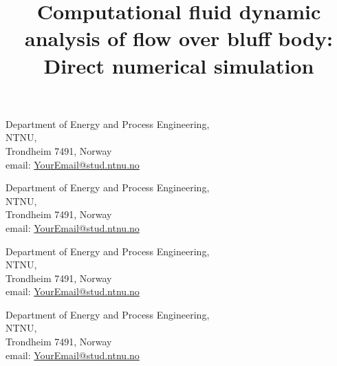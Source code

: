 \documentclass[subscriptcorrection,upint,varvw,mathalfa=cal=euler,barcolor=black,balance,hyphenate,french,pdf-a,nolists]{asmejour}
\begin{document}

	{Department of Energy and Process Engineering,\\
	NTNU,\\
	Trondheim 7491, Norway \\
	email: \href{mailto:YourEmail@stud.ntnu.no}{YourEmail@stud.ntnu.no}}

	{Department of Energy and Process Engineering,\\
	NTNU,\\
	Trondheim 7491, Norway \\
	email: \href{mailto:YourEmail@stud.ntnu.no}{YourEmail@stud.ntnu.no}}

	{Department of Energy and Process Engineering,\\
	NTNU,\\
	Trondheim 7491, Norway \\
	email: \href{mailto:YourEmail@stud.ntnu.no}{YourEmail@stud.ntnu.no}}

	{Department of Energy and Process Engineering,\\
	NTNU,\\
	Trondheim 7491, Norway \\
	email: \href{mailto:YourEmail@stud.ntnu.no}{YourEmail@stud.ntnu.no}}

\title{Computational fluid dynamic analysis of flow over bluff body: Direct numerical simulation}

\end{document}
